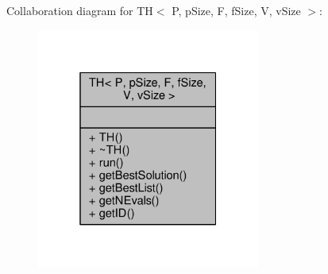 Collaboration diagram for TH$<$ P, p\+Size, F, f\+Size, V, v\+Size $>$\+:
\nopagebreak
\begin{figure}[H]
\begin{center}
\leavevmode
\includegraphics[width=208pt]{classTH__coll__graph}
\end{center}
\end{figure}

